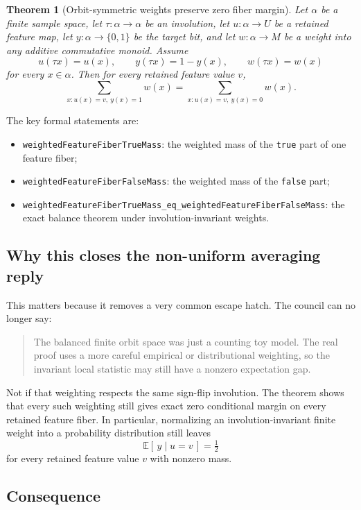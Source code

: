 \documentclass[11pt]{article}
\newtheorem{theorem}{Theorem}[section]
\theoremstyle{remark}
\begin{document}
\begin{theorem}[Orbit-symmetric weights preserve zero fiber margin]
Let \(\alpha\) be a finite sample space, let \(\tau : \alpha \to \alpha\) be an involution, let
\(u : \alpha \to U\) be a retained feature map, let \(y : \alpha \to \{0,1\}\) be the target bit,
and let \(w : \alpha \to M\) be a weight into any additive commutative monoid.  Assume
\[
  u(\tau x) = u(x), \qquad y(\tau x) = 1-y(x), \qquad w(\tau x) = w(x)
\]
for every \(x \in \alpha\).  Then for every retained feature value \(v\),
\[
  \sum_{x : u(x)=v,\ y(x)=1} w(x)
  =
  \sum_{x : u(x)=v,\ y(x)=0} w(x).
\]
\end{theorem}

\noindent
The key formal statements are:
\begin{itemize}[leftmargin=1.5em]
  \item \texttt{weightedFeatureFiberTrueMass}: the weighted mass of the \texttt{true} part of one
  feature fiber;
  \item \texttt{weightedFeatureFiberFalseMass}: the weighted mass of the \texttt{false} part;
  \item \texttt{weightedFeatureFiberTrueMass\_eq\_weightedFeatureFiberFalseMass}: the exact balance
  theorem under involution-invariant weights.
\end{itemize}

\subsection{Why this closes the non-uniform averaging reply}

This matters because it removes a very common escape hatch.  The council can no longer say:
\begin{quote}
The balanced finite orbit space was just a counting toy model.  The real proof uses a more
careful empirical or distributional weighting, so the invariant local statistic may still have a
nonzero expectation gap.
\end{quote}

Not if that weighting respects the same sign-flip involution.  The theorem shows that every such
weighting still gives exact zero conditional margin on every retained feature fiber.  In
particular, normalizing an involution-invariant finite weight into a probability distribution
still leaves
\[
  \mathbb{E}[\,y \mid u=v\,] = \tfrac12
\]
for every retained feature value \(v\) with nonzero mass.

\subsection{Consequence}
\end{document}
